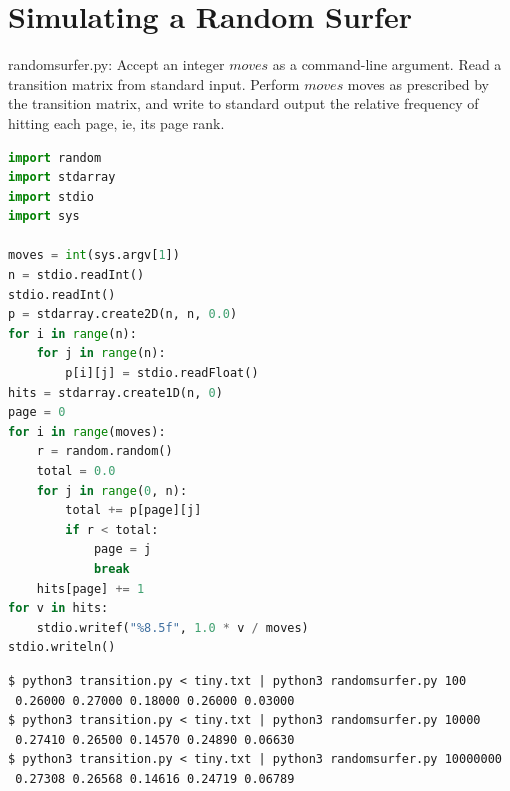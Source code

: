 \documentclass[8pt,a4paper,compress]{beamer}
\begin{document}
\section{Simulating a Random Surfer}
\begin{frame}[fragile]
\pause

\begin{framed}
\tiny randomsurfer.py: Accept an integer $moves$ as a command-line argument. Read a transition matrix from standard input. Perform $moves$ moves as prescribed by the transition matrix, and write to standard output the relative frequency of hitting each page, ie, its page rank.
\end{framed}

\begin{minipage}{170pt}
\begin{lstlisting}[language=Python]
import random
import stdarray
import stdio
import sys

moves = int(sys.argv[1])
n = stdio.readInt()
stdio.readInt()
p = stdarray.create2D(n, n, 0.0)
for i in range(n):
    for j in range(n):
        p[i][j] = stdio.readFloat()
hits = stdarray.create1D(n, 0)
page = 0
for i in range(moves):
    r = random.random()
    total = 0.0
    for j in range(0, n):
        total += p[page][j]
        if r < total:
            page = j
            break
    hits[page] += 1
for v in hits:
    stdio.writef("%8.5f", 1.0 * v / moves)
stdio.writeln()
\end{lstlisting}
\end{minipage}
\begin{minipage}{130pt}
\end{minipage}
\end{frame}

\begin{frame}[fragile]
\pause

\begin{lstlisting}[language={}]
$ python3 transition.py < tiny.txt | python3 randomsurfer.py 100
 0.26000 0.27000 0.18000 0.26000 0.03000
$ python3 transition.py < tiny.txt | python3 randomsurfer.py 10000
 0.27410 0.26500 0.14570 0.24890 0.06630
$ python3 transition.py < tiny.txt | python3 randomsurfer.py 10000000
 0.27308 0.26568 0.14616 0.24719 0.06789
\end{lstlisting}
\end{frame}
\end{document}

